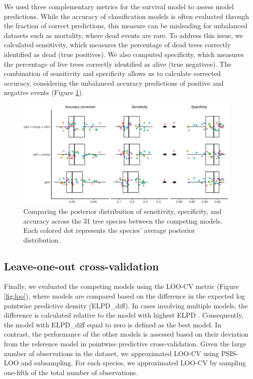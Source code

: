 We used three complementary metrics for the survival model to assess
model predictions. While the accuracy of classification models is often
evaluated through the fraction of correct predictions, this measure can
be misleading for unbalanced datasets such as mortality, where dead
events are rare. To address this issue, we calculated sensitivity, which
measures the percentage of dead trees correctly identified as dead (true
positives). We also computed specificity, which measures the percentage
of live trees correctly identified as alive (true negatives). The
combination of sensitivity and specificity allows us to calculate
corrected accuracy, considering the unbalanced accuracy predictions of
positive and negative events (Figure \ref{fig:Acc}).\\

\hypertarget{fig:Acc}{%
\begin{figure}
\centering
\includegraphics{manuscript/figs/supp1_4.png}
\caption[{Comparing the posterior distribution of sensitivity,
specificity, and accuracy across the 31 tree species between the
competing models.}]{Comparing the posterior distribution of sensitivity,
specificity, and accuracy across the 31 tree species between the
competing models. Each colored dot represents the species' average
posterior distribution.}
\label{fig:Acc}
\end{figure}
}

\hypertarget{leave-one-out-cross-validation}{%
\subsection{Leave-one-out
cross-validation}\label{leave-one-out-cross-validation}}

Finally, we evaluated the competing models using the LOO-CV metric
(Figure \ref{fig:loo}), where models are compared based on the
difference in the expected log pointwise predictive density
(ELPD\_diff). In cases involving multiple models, the difference is
calculated relative to the model with highest ELPD
\citep{vehtari2017practical}. Consequently, the model with ELPD\_diff
equal to zero is defined as the best model. In contrast, the performance
of the other models is assessed based on their deviation from the
reference model in pointwise predictive cross-validation. Given the
large number of observations in the dataset, we approximated LOO-CV
using PSIS-LOO and subsampling. For each species, we approximated LOO-CV
by sampling one-fifth of the total number of observations.\\

